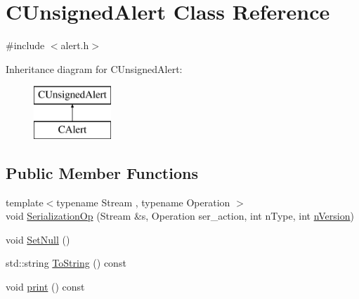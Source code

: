 \hypertarget{class_c_unsigned_alert}{}\section{C\+Unsigned\+Alert Class Reference}
\label{class_c_unsigned_alert}


{\ttfamily \#include $<$alert.\+h$>$}

Inheritance diagram for C\+Unsigned\+Alert\+:\begin{figure}[H]
\begin{center}
\leavevmode
\includegraphics[height=2.000000cm]{class_c_unsigned_alert}
\end{center}
\end{figure}
\subsection*{Public Member Functions}
\begin{DoxyCompactItemize}
\item 
{\footnotesize template$<$typename Stream , typename Operation $>$ }\\void \hyperlink{class_c_unsigned_alert_acdf81abb731f9fc8d2c04618f2f4d79d}{Serialization\+Op} (Stream \&s, Operation ser\+\_\+action, int n\+Type, int \hyperlink{class_c_unsigned_alert_ad8fad8e8f62caaf8162fad19170de2cf}{n\+Version})
\item 
void \hyperlink{class_c_unsigned_alert_a9d387307eb60095e50134d10eea3ad69}{Set\+Null} ()
\item 
std\+::string \hyperlink{class_c_unsigned_alert_a326fbf3fae6b9ac2b7043350570b770f}{To\+String} () const 
\item 
void \hyperlink{class_c_unsigned_alert_a289332e203d0e95ea8f27375f43e9955}{print} () const 
\end{DoxyCompactItemize}
